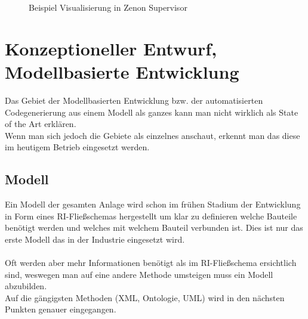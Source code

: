 \begin{figure}[hbt!]
 \centering
	\caption{Beispiel Visualisierung in Zenon Supervisor}
\end{figure}


\newpage
\section{Konzeptioneller Entwurf, Modellbasierte Entwicklung}
Das Gebiet der Modellbasierten Entwicklung bzw. der automatisierten Codegenerierung aus einem Modell als ganzes kann man nicht wirklich als State of the Art erklären.\\
Wenn man sich jedoch die Gebiete als einzelnes anschaut, erkennt man das diese im heutigem Betrieb eingesetzt werden.
\subsection{Modell}
Ein Modell der gesamten Anlage wird schon im frühen Stadium der Entwicklung in Form eines RI-Fließschemas hergestellt um klar zu definieren welche Bauteile benötigt werden und welches mit welchem Bauteil verbunden ist. Dies ist nur das erste Modell das in der Industrie eingesetzt wird.\\
\\
Oft werden aber mehr Informationen benötigt als im RI-Fließschema ersichtlich sind, weswegen man auf eine andere Methode umsteigen muss ein Modell abzubilden.\\
Auf die gängigsten Methoden (XML, Ontologie, UML) wird in den nächsten Punkten genauer eingegangen.
